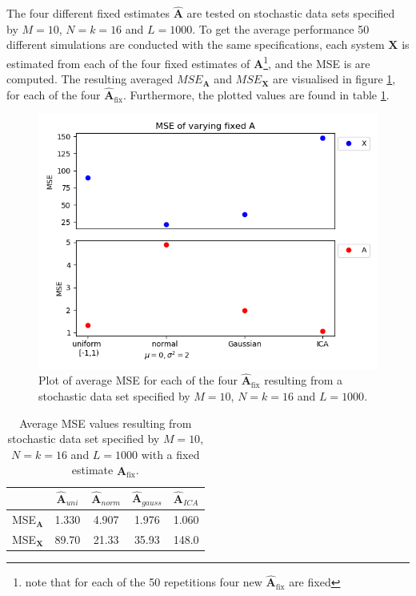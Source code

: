 The four different fixed estimates $\hat{\mathbf{A}}$ are tested on stochastic data sets specified by $M = 10$, $N = k = 16$ and $L = 1000$. 
To get the average performance 50 different simulations are conducted with the same specifications, each system $\textbf{X}$ is estimated from each of the four fixed estimates of $\textbf{A}$\footnote{note that for each of the 50 repetitions  four new $\hat{\textbf{A}}_{\text{fix}}$ are fixed}, and the MSE is are computed. The resulting averaged $MSE_{\textbf{A}}$ and $MSE_{\textbf{X}}$ are visualised  in figure \ref{fig:vary_A}, for each of the four $\hat{\mathbf{A}}_{\text{fix}}$. 
Furthermore, the plotted values are found in table \ref{tab:fixed}.

\begin{figure}[H]
\centering
\includegraphics[scale=0.5]{figures/ch_6/A_fix.png}
\caption{Plot of average MSE for each of the four $\hat{\mathbf{A}}_{\text{fix}}$ resulting from a stochastic data set specified by $M=10$, $N=k=16$ and $L=1000$.}
\label{fig:vary_A}
\end{figure}
\noindent

\begin{table}[H]
\centering
\begin{tabular}{|c|c|c|c|c|}
\hline
 & $\hat{\textbf{A}}_{uni}$ & $\hat{\textbf{A}}_{norm}$	 & $\hat{\textbf{A}}_{gauss}$ & $\hat{\textbf{A}}_{ICA}$ \\
\hline
MSE$_\mathbf{A}$ & 1.330 & 4.907 & 1.976 & 1.060 \\
\hline
MSE$_\mathbf{X}$ & 89.70 & 21.33 & 35.93 & 148.0 \\
\hline
\end{tabular}
\caption{Average MSE values resulting from stochastic data set specified by $M=10$, $N=k=16$ and $L=1000$ with a fixed estimate $\hat{\mathbf{A}}_{\text{fix}}$.}
\label{tab:fixed}
\end{table}


